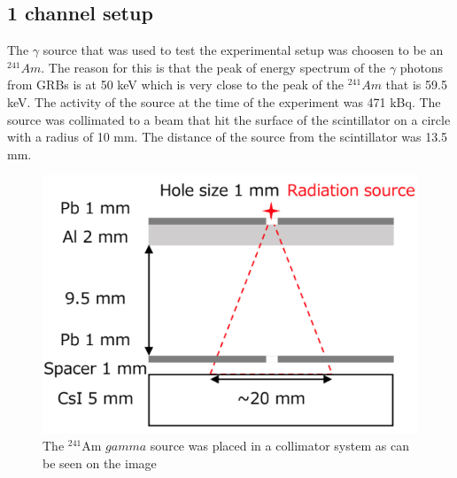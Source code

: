 \documentclass[12pt, a4paper,titlepage]{article}
\numberwithin{equation}{section}
\numberwithin{figure}{section}
\begin{document}
  

\pagebreak

\subsection{1 channel setup}

The $\gamma$ source that was used to test the experimental setup was choosen to be an $^{241}Am$. The reason for this is that the peak of energy spectrum of the $\gamma$ photons from GRBs is at 50 keV which is very close to the peak of the $^{241}Am$ that is 59.5 keV. The activity of the source at the time of the experiment was 471 kBq. The source was collimated to a beam that hit the surface of the scintillator on a circle with a radius of 10 mm. The distance of the source from the scintillator was 13.5 mm. 

\begin{figure}[h!]
\includegraphics[width=150.0mm]{images/irradiation.png}
\caption{The $^{241}$Am $gamma$ source was placed in a collimator system as can be seen on the image \cite{kento}}
\label{fig:this_set}
\end{figure}
\end{document}
